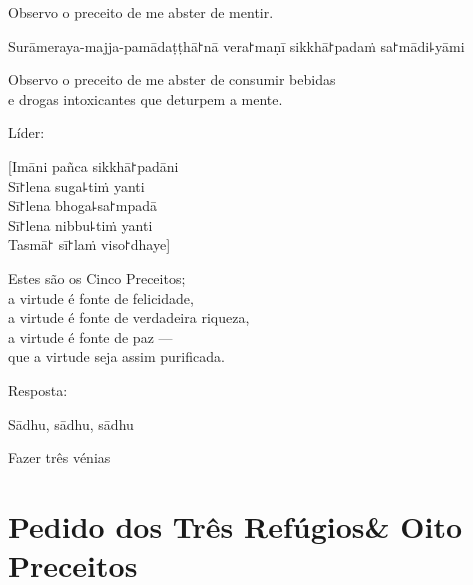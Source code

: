 \enlargethispage{\baselineskip}

\begin{english}
  Observo o preceito de me abster de mentir.
\end{english}

\clearpage

\begin{precept}
  \setcounter{enumi}{4}
  \item Surāmeraya-majja-pamādaṭṭhā꜓nā vera꜓maṇī sikkhā꜓padaṁ sa꜓mādi꜕yāmi
\end{precept}

\begin{english}
  Observo o preceito de me abster de consumir bebidas\\
  e drogas intoxicantes que deturpem a mente.
\end{english}

\begin{instruction}
  Líder:
\end{instruction}

[Imāni pañca sikkhā꜓padāni\\
Sī꜓lena suga꜕tiṁ yanti\\
Sī꜓lena bhoga꜕sa꜓mpadā\\
Sī꜓lena nibbu꜕tiṁ yanti\\
Tasmā꜓ sī꜓laṁ viso꜓dhaye]

\begin{english}
  Estes são os Cinco Preceitos;\\
  a virtude é fonte de felicidade,\\
  a virtude é fonte de verdadeira riqueza,\\
  a virtude é fonte de paz ---\\
  que a virtude seja assim purificada.
\end{english}

\begin{instruction}
  Resposta:
\end{instruction}

Sādhu, sādhu, sādhu

\begin{instruction}
  Fazer três vénias
\end{instruction}

\clearpage
\chapter[Três Refúgios \& Oito Preceitos]{Pedido dos Três Refúgios\newline \& Oito Preceitos}

